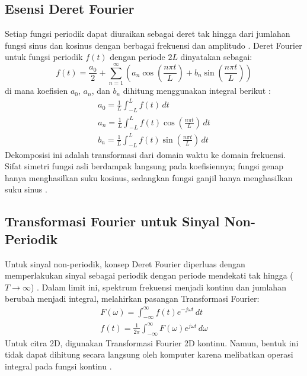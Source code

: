 \documentclass[a4paper]{article}
\begin{document}
\subsection{Esensi Deret Fourier}
Setiap fungsi periodik dapat diuraikan sebagai deret tak hingga dari jumlahan fungsi sinus dan kosinus dengan berbagai frekuensi dan amplitudo \cite{bracewell1999fourier}. Deret Fourier untuk fungsi periodik $f(t)$ dengan periode $2L$ dinyatakan sebagai:
\begin{equation} \label{eq:fourier_series}
  f(t) = \frac{a_0}{2} + \sum_{n=1}^{\infty} \left( a_n \cos\left(\frac{n\pi t}{L}\right) + b_n \sin\left(\frac{n\pi t}{L}\right) \right)
\end{equation}
di mana koefisien $a_0$, $a_n$, dan $b_n$ dihitung menggunakan integral berikut \cite{oppenheim1996signals}:
\begin{gather}
  a_0 = \frac{1}{L} \int_{-L}^{L} f(t) \,dt \label{eq:a0} \\
  a_n = \frac{1}{L} \int_{-L}^{L} f(t) \cos\left(\frac{n\pi t}{L}\right) \,dt \label{eq:an} \\
  b_n = \frac{1}{L} \int_{-L}^{L} f(t) \sin\left(\frac{n\pi t}{L}\right) \,dt \label{eq:bn}
\end{gather}
Dekomposisi ini adalah transformasi dari domain waktu ke domain frekuensi. Sifat simetri fungsi asli berdampak langsung pada koefisiennya; fungsi genap hanya menghasilkan suku kosinus, sedangkan fungsi ganjil hanya menghasilkan suku sinus \cite{bracewell1999fourier}.

\subsection{Transformasi Fourier untuk Sinyal Non-Periodik}
Untuk sinyal non-periodik, konsep Deret Fourier diperluas dengan memperlakukan sinyal sebagai periodik dengan periode mendekati tak hingga ($T \to \infty$) \cite{bracewell1999fourier}. Dalam limit ini, spektrum frekuensi menjadi kontinu dan jumlahan berubah menjadi integral, melahirkan pasangan Transformasi Fourier:
\begin{gather}
  F(\omega) = \int_{-\infty}^{\infty} f(t) e^{-j\omega t} \,dt \label{eq:ft_forward} \\
  f(t) = \frac{1}{2\pi} \int_{-\infty}^{\infty} F(\omega) e^{j\omega t} \,d\omega \label{eq:ft_inverse}
\end{gather}
Untuk citra 2D, digunakan Transformasi Fourier 2D kontinu. Namun, bentuk ini tidak dapat dihitung secara langsung oleh komputer karena melibatkan operasi integral pada fungsi kontinu \cite{oppenheim1996signals}.
\end{document}

